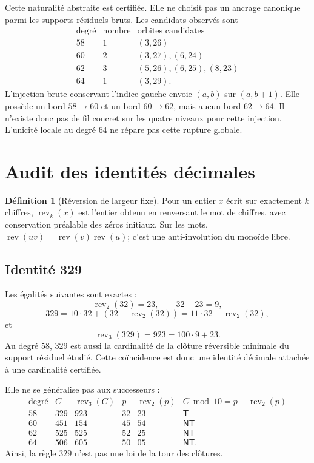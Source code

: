 \documentclass[11pt,a4paper]{article}
\theoremstyle{definition}
\newtheorem{definition}[theorem]{Définition}
\newcommand{\Rev}{\operatorname{rev}}
\newcommand{\T}{\mathsf{T}}
\newcommand{\NT}{\mathsf{NT}}
\begin{document}
Cette naturalité abstraite est certifiée. Elle ne choisit pas un ancrage canonique
parmi les supports résiduels bruts. Les candidats observés sont
\[
\begin{array}{c|c|c}
\text{degré}&\text{nombre}&\text{orbites candidates}\\
\hline
58&1&(3,26)\\
60&2&(3,27),(6,24)\\
62&3&(5,26),(6,25),(8,23)\\
64&1&(3,29).
\end{array}
\]
L'injection brute conservant l'indice gauche envoie $(a,b)$ sur $(a,b+1)$.
Elle possède un bord $58\to60$ et un bord $60\to62$, mais aucun bord
$62\to64$. Il n'existe donc pas de fil concret sur les quatre niveaux pour cette
injection. L'unicité locale au degré $64$ ne répare pas cette rupture globale.

\section{Audit des identités décimales}

\begin{definition}[Réversion de largeur fixe]
Pour un entier $x$ écrit sur exactement $k$ chiffres, $\Rev_k(x)$ est l'entier obtenu
en renversant le mot de chiffres, avec conservation préalable des zéros initiaux.
Sur les mots, $\Rev(uv)=\Rev(v)\Rev(u)$; c'est une anti-involution du monoïde libre.
\end{definition}

\subsection{Identité 329}

Les égalités suivantes sont exactes :
\[
 \Rev_2(32)=23,\qquad 32-23=9,
\]
\[
 \boxed{329=10\cdot32+(32-\Rev_2(32))=11\cdot32-\Rev_2(32)},
\]
et
\[
 \Rev_3(329)=923=100\cdot9+23.
\]
Au degré $58$, $329$ est aussi la cardinalité de la clôture réversible minimale du
support résiduel étudié. Cette coïncidence est donc une identité décimale attachée à
une cardinalité certifiée.

Elle ne se généralise pas aux successeurs :
\[
\begin{array}{c|r|r|r|r|c}
\text{degré}&C&\Rev_3(C)&p&\Rev_2(p)&C\bmod10=p-\Rev_2(p)\\
\hline
58&329&923&32&23&\T\\
60&451&154&45&54&\NT\\
62&525&525&52&25&\NT\\
64&506&605&50&05&\NT.
\end{array}
\]
Ainsi, la règle $329$ n'est pas une loi de la tour des clôtures.
\end{document}
